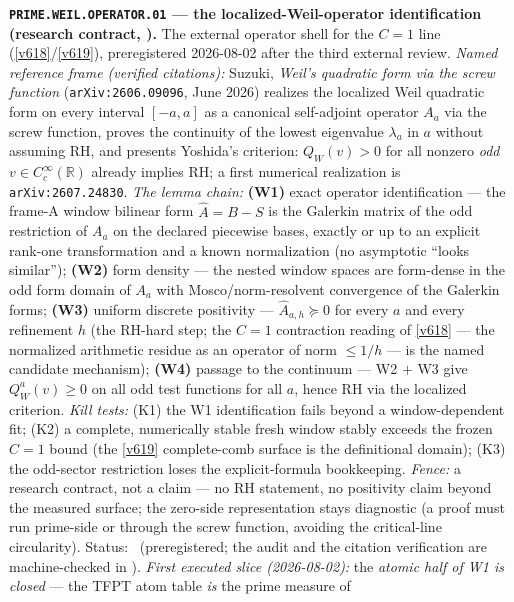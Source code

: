\documentclass[11pt,a4paper]{article}
\begin{document}
\par\smallskip\noindent\textbf{\texttt{PRIME.WEIL.OPERATOR.01} --- the
localized-Weil-operator identification (research contract, \mO).}
The external operator shell for the $C=1$ line (\vref{v618}/\vref{v619}),
preregistered 2026-08-02 after the third external review.  \emph{Named
reference frame (verified citations):} Suzuki, \emph{Weil's quadratic
form via the screw function} (\texttt{arXiv:2606.09096}, June 2026)
realizes the localized Weil quadratic form on every interval $[-a,a]$
as a canonical self-adjoint operator $A_a$ via the screw function,
proves the continuity of the lowest eigenvalue $\lambda_a$ in $a$
without assuming RH, and presents Yoshida's criterion: $Q_W(v)>0$ for
all nonzero \emph{odd} $v\in C_c^\infty(\mathbb R)$ already implies RH;
a first numerical realization is \texttt{arXiv:2607.24830}.  \emph{The
lemma chain:} \textbf{(W1)} exact operator identification --- the
frame-A window bilinear form $\widehat A=B-S$ is the Galerkin matrix of
the odd restriction of $A_a$ on the declared piecewise bases, exactly
or up to an explicit rank-one transformation and a known normalization
(no asymptotic ``looks similar''); \textbf{(W2)} form density --- the
nested window spaces are form-dense in the odd form domain of $A_a$
with Mosco/norm-resolvent convergence of the Galerkin forms;
\textbf{(W3)} uniform discrete positivity --- $\widehat A_{a,h}\succeq0$
for every $a$ and every refinement $h$ (the RH-hard step; the $C=1$
contraction reading of \vref{v618} --- the normalized arithmetic
residue as an operator of norm $\le1/h$ --- is the named candidate
mechanism); \textbf{(W4)} passage to the continuum --- W2 $+$ W3 give
$Q_W^a(v)\ge0$ on all odd test functions for all $a$, hence RH via the
localized criterion.  \emph{Kill tests:} (K1) the W1 identification
fails beyond a window-dependent fit; (K2) a complete, numerically
stable fresh window stably exceeds the frozen $C=1$ bound (the
\vref{v619} complete-comb surface is the definitional domain); (K3) the
odd-sector restriction loses the explicit-formula bookkeeping.
\emph{Fence:} a research contract, not a claim --- no RH statement, no
positivity claim beyond the measured surface; the zero-side
representation stays diagnostic (a proof must run prime-side or through
the screw function, avoiding the critical-line circularity).  Status:
\mO\ (preregistered; the audit and the citation verification are
machine-checked in ).
\emph{First executed slice (2026-08-02):} the \emph{atomic half of W1
is closed} --- the TFPT atom table \emph{is} the prime measure of
\end{document}
